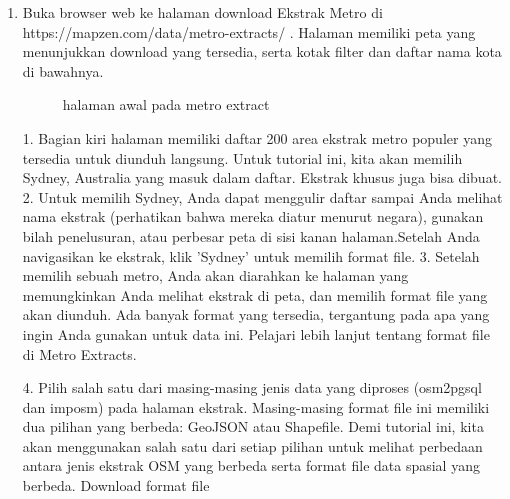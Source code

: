 \begin{enumerate}
\item
Buka browser web ke halaman download Ekstrak Metro di https://mapzen.com/data/metro-extracts/ . Halaman memiliki peta yang menunjukkan download yang tersedia, serta kotak filter dan daftar nama kota di bawahnya.

\begin{figure}[ht]
\caption{halaman awal pada metro extract}
\label {halamanawal}
\end{figure}

1.	Bagian kiri halaman memiliki daftar 200 area ekstrak metro populer yang tersedia untuk diunduh langsung. Untuk tutorial ini, kita akan memilih Sydney, Australia yang masuk dalam daftar. Ekstrak khusus juga bisa dibuat.
2.	Untuk memilih Sydney, Anda dapat menggulir daftar sampai Anda melihat nama ekstrak (perhatikan bahwa mereka diatur menurut negara), gunakan bilah penelusuran, atau perbesar peta di sisi kanan halaman.Setelah Anda navigasikan ke ekstrak, klik 'Sydney' untuk memilih format file.
3.	Setelah memilih sebuah metro, Anda akan diarahkan ke halaman yang memungkinkan Anda melihat ekstrak di peta, dan memilih format file yang akan diunduh. Ada banyak format yang tersedia, tergantung pada apa yang ingin Anda gunakan untuk data ini. Pelajari lebih lanjut tentang format file di Metro Extracts.
 
4.	Pilih salah satu dari masing-masing jenis data yang diproses (osm2pgsql dan imposm) pada halaman ekstrak. Masing-masing format file ini memiliki dua pilihan yang berbeda: GeoJSON atau Shapefile. Demi tutorial ini, kita akan menggunakan salah satu dari setiap pilihan untuk melihat perbedaan antara jenis ekstrak OSM yang berbeda serta format file data spasial yang berbeda.
Download format file
 

\end{enumerate}
